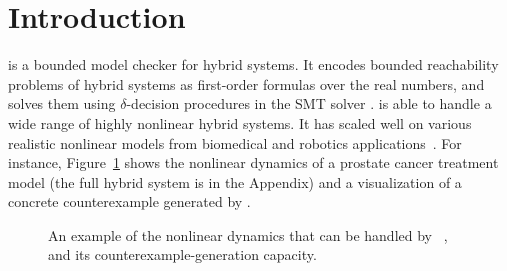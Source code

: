 \section{Introduction}\label{sec:intro}


\dReach{} is a bounded model checker for hybrid systems. It encodes
bounded reachability problems of hybrid systems as first-order
formulas over the real numbers, and solves them using
$\delta$-decision procedures in the SMT solver \dReal{}. \dReach{} is
able to handle a wide range of highly nonlinear hybrid systems. It has
scaled well on various realistic nonlinear models from biomedical and
robotics applications~\cite{}. For instance, Figure~\ref{fig:prostate-example}
shows the nonlinear dynamics of a prostate cancer treatment model (the full hybrid system is
in the Appendix) and a visualization of a concrete counterexample generated by \dReach{}.
\begin{figure}[!h]
  \hfill
  \caption{An example of the nonlinear dynamics that can be handled by ~\dReach{}, and its counterexample-generation capacity.}
  \label{fig:prostate-example}
\end{figure}

